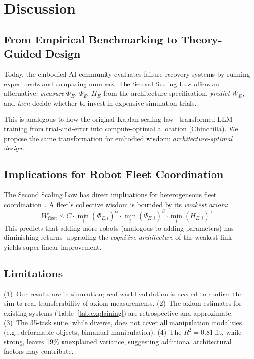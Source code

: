 \documentclass{article}
\begin{document}
\section{Discussion}
\label{sec:discussion}

\subsection{From Empirical Benchmarking to Theory-Guided Design}

Today, the embodied AI community evaluates failure-recovery systems by running experiments and comparing numbers.
The Second Scaling Law offers an alternative: \emph{measure} $\Phi_E$, $\Psi_E$, $H_E$ from the architecture specification, \emph{predict} $W_E$, and \emph{then} decide whether to invest in expensive simulation trials.

This is analogous to how the original Kaplan scaling law~\citep{kaplan2020scaling} transformed LLM training from trial-and-error into compute-optimal allocation (Chinchilla).
We propose the same transformation for embodied wisdom: \emph{architecture-optimal design}.

\subsection{Implications for Robot Fleet Coordination}

The Second Scaling Law has direct implications for heterogeneous fleet coordination~\citep{fleet2025, comurus2025}.
A fleet's collective wisdom is bounded by its \emph{weakest axiom}:
\begin{equation}
    W_{\text{fleet}} \leq C \cdot \min_i(\Phi_{E,i})^{\alpha} \cdot \min_i(\Psi_{E,i})^{\beta} \cdot \min_i(H_{E,i})^{\gamma}
\end{equation}
This predicts that adding more robots (analogous to adding parameters) has diminishing returns; upgrading the \emph{cognitive architecture} of the weakest link yields super-linear improvement.

\subsection{Limitations}

(1)~Our results are in simulation; real-world validation is needed to confirm the sim-to-real transferability of axiom measurements.
(2)~The axiom estimates for existing systems (Table~\ref{tab:explaining}) are retrospective and approximate.
(3)~The 35-task suite, while diverse, does not cover all manipulation modalities (e.g., deformable objects, bimanual manipulation).
(4)~The $R^2 = 0.81$ fit, while strong, leaves 19\% unexplained variance, suggesting additional architectural factors may contribute.
\end{document}
